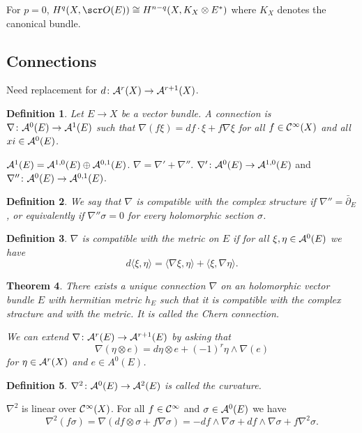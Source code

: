 \documentclass[A4paper, british]{amsart}
\theoremstyle{darkgreentheorem}
\newtheorem{thm}{Theorem}[section]
\theoremstyle{darkbluedefinition}
\newtheorem{defn}[thm]{Definition}
\theoremstyle{darkredexample}
\theoremstyle{remark}
\newcommand{\1}{\mathbbm{1}}
\newcommand{\ot}{\otimes}
\newcommand{\op}{\oplus}
\begin{document}
For $p=0$, $H^{q}(X,\O(E))\cong H^{n-q}(X,K_{X}\ot E^{*})$ where $K_{X}$ denotes the canonical bundle.

\subsection{Connections}

Need replacement for $d\colon \mathcal{A}^{r}(X)\to \mathcal{A}^{r+1}(X)$.

\begin{defn}
    Let $E\to X$ be a vector bundle.
    A \textit{connection} is $\nabla \colon \mathcal{A}^{0}(E)\to \mathcal{A}^{1}(E)$ such that $\nabla(f\xi)=df\cdot \xi + f\nabla \xi$ for all $f\in \mathcal{C}^{\infty}(X)$ and all $xi\in \mathcal{A}^{0}(E)$.
\end{defn}

$\calA^{1}(E)=\calA^{1,0}(E)\op \calA^{0,1}(E)$.
$\nabla =\nabla'+ \nabla''$.
$\nabla'\colon \mathcal{A}^{0}(E)\to \mathcal{A}^{1,0}(E)$ and $\nabla''\colon \mathcal{A}^{0}(E)\to \mathcal{A}^{0,1}(E)$.

\begin{defn}
    We say that $\nabla $ is compatible with the complex structure if $\nabla''=\bar{\partial}_{E}$, or equivalently if $\nabla''\sigma=0$ for every holomorphic section $\sigma$.
\end{defn}

\begin{defn}
    $\nabla$ is compatible with the metric on $E$ if for all $\xi,\eta\in \mathcal{A}^{0}(E)$ we have
    \[ d\langle \xi ,\eta \rangle =\langle \nabla \xi ,\eta\rangle + \langle \xi,\nabla\eta \rangle.\]
\end{defn}

\begin{thm}
    There exists a unique connection $\nabla$ on an holomorphic vector bundle $E$ with hermitian metric $h_{E}$ such that it is compatible with the complex stracture and with the metric.
    It is called the \textit{Chern connection}.

    We can extend $\nabla \colon \mathcal{A}^{r}(E)\to \mathcal{A}^{r+1}(E)$ by asking that
    \[ \nabla(\eta\ot e)=d\eta \ot e+(-1)^{r}\eta \wedge \nabla(e) \]
    for $\eta \in \mathcal{A}^{r}(X)$ and $e\in A^{0}(E)$.
\end{thm}

\begin{defn}
    $\nabla^{2}\colon \mathcal{A}^{0}(E)\to \mathcal{A}^{2}(E)$ is called the \textit{curvature}.
\end{defn}

$\nabla^{2}$ is linear over $\mathcal{C}^{\infty}(X)$.
For all $f\in \mathcal{C}^{\infty}$ and $\sigma \in \mathcal{A}^{0}(E)$ we have
\[ \nabla^{2}(f\sigma)=\nabla(df\ot \sigma + f\nabla \sigma)=-df\wedge \nabla\sigma +df\wedge \nabla \sigma +f\nabla^{2}\sigma.\]
\end{document}
